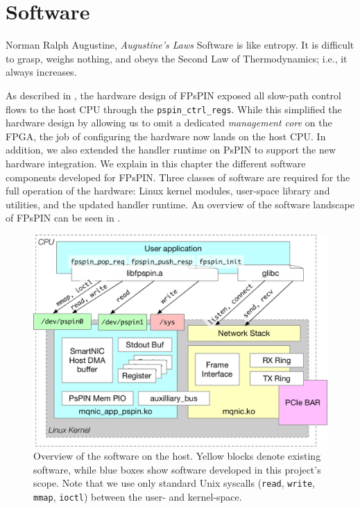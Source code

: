 \chapter{Software} \label{chap:software}
\begin{chapquote}{Norman Ralph Augustine, \textit{Augustine's Laws}}
Software is like entropy. It is difficult to grasp, weighs nothing, and obeys the Second Law of Thermodynamics; i.e., it always increases.
\end{chapquote}

As described in , the hardware design of FPsPIN exposed all slow-path control flows to the host CPU through the \texttt{pspin\_\-ctrl\_\-regs}.  While this simplified the hardware design by allowing us to omit a dedicated \emph{management core} on the FPGA, the job of configuring the hardware now lands on the host CPU.  In addition, we also extended the handler runtime on PsPIN to support the new hardware integration.  We explain in this chapter the different software components developed for FPsPIN.  Three classes of software are required for the full operation of the hardware: Linux kernel modules, user-space library and utilities, and the updated handler runtime.  An overview of the software landscape of FPsPIN can be seen in .

\begin{figure}
    \centering
    \includegraphics[width=.9\linewidth]{figures/sw-overview.pdf}
    \caption{Overview of the software on the host.  Yellow blocks denote existing software, while blue boxes show software developed in this project's scope.  Note that we use only standard Unix syscalls (\texttt{read}, \texttt{write}, \texttt{mmap}, \texttt{ioctl}) between the user- and kernel-space.} \label{fig:sw-overview}
\end{figure}


